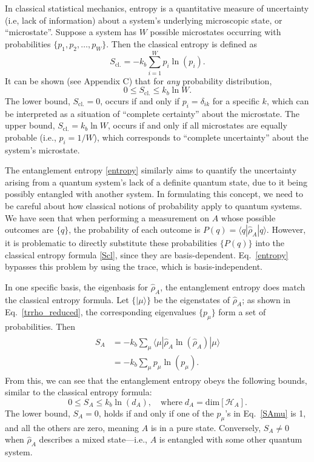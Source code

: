 \documentclass[pra,12pt]{revtex4-2}
\begin{document}
In classical statistical mechanics, entropy is a quantitative measure
of uncertainty (i.e, lack of information) about a system's underlying
microscopic state, or ``microstate''.  Suppose a system has $W$
possible microstates occurring with probabilities $\{p_1, p_2, \dots,
p_W\}$.  Then the classical entropy is defined as
\begin{equation}
  S_{\mathrm{cl.}} = - k_b \sum_{i=1}^W p_i \ln(p_i).
  \label{Scl}
\end{equation}
It can be shown (see Appendix C) that for \textit{any} probability
distribution,
\begin{equation}
  0 \le S_{\mathrm{cl.}} \le k_b\ln W.
\end{equation}
The lower bound, $S_{\mathrm{cl.}} = 0$, occurs if and only if $p_i =
\delta_{ik}$ for a specific $k$, which can be interpreted as a
situation of ``complete certainty'' about the microstate.  The upper
bound, $S_{\mathrm{cl.}} = k_b\ln W$, occurs if and only if all
microstates are equally probable (i.e., $p_i = 1/W$), which
corresponds to ``complete uncertainty'' about the system's microstate.

The entanglement entropy \eqref{entropy} similarly aims to quantify
the uncertainty arising from a quantum system's lack of a definite
quantum state, due to it being possibly entangled with another system.
In formulating this concept, we need to be careful about how classical
notions of probability apply to quantum systems.  We have seen that
when performing a measurement on $A$ whose possible outcomes are
$\{q\}$, the probability of each outcome is $P(q) = \langle q |
\hat{\rho}_A|q\rangle$.  However, it is problematic to directly
substitute these probabilities $\{P(q)\}$ into the classical entropy
formula \eqref{Scl}, since they are basis-dependent.
Eq.~\eqref{entropy} bypasses this problem by using the trace, which is
basis-independent.

In one specific basis, the eigenbasis for $\hat{\rho}_A$, the
entanglement entropy does match the classical entropy formula.  Let
$\{|\mu\rangle\}$ be the eigenstates of $\hat{\rho}_A$; as shown in
Eq.~\eqref{trrho_reduced}, the corresponding eigenvalues $\{p_\mu\}$
form a set of probabilities.  Then
\begin{align}
  \begin{aligned}
    S_A &= -k_b \sum_\mu \langle \mu | \hat{\rho}_A \ln(\hat{\rho}_A) | \mu\rangle  \\
    &= - k_b \sum_\mu p_\mu \ln(p_\mu).
    \label{SAmu}
  \end{aligned}
\end{align}
From this, we can see that the entanglement entropy obeys the
following bounds, similar to the classical entropy formula:
\begin{equation}
  0 \le S_A \le k_b\ln(d_A), \quad
  \mathrm{where}\; d_A = \mathrm{dim}\left[\mathscr{H}_A\right].
  \label{Sabounds}
\end{equation}
The lower bound, $S_A = 0$, holds if and only if one of the $p_\mu$'s
in Eq.~\eqref{SAmu} is 1, and all the others are zero, meaning $A$ is
in a pure state.  Conversely, $S_{A} \ne 0$ when $\hat{\rho}_A$
describes a mixed state---i.e., $A$ is entangled with some other
quantum system.
\end{document}
